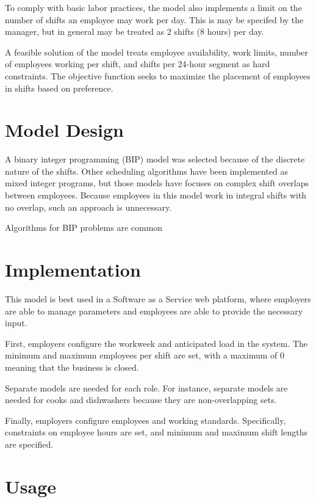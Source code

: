 To comply with basic labor practices, the model also implements a limit on the number of shifts an employee may work per day. This is may be specifed by the manager, but in general may be treated as 2 shifts (8 hours) per day. 

A feasible solution of the model treats employee availability, work limits, number of employees working per shift, and shifts per 24-hour segment as hard constraints. The objective function seeks to maximize the placement of employees in shifts based on preference.

\section{Model Design}

A binary integer programming (BIP) model was selected because of the discrete nature of the shifts. Other scheduling algorithms have been implemented as mixed integer programs, but those models have focuses on complex shift overlaps between employees. Because employees in this model work in integral shifts with no overlap, such an approach is unnecessary. 

Algorithms for BIP problems are common 

\section{Implementation}

This model is best used in a Software as a Service web platform, where employers are able to manage parameters and employees are able to provide the necessary input. 

First, employers configure the workweek and anticipated load in the system. The minimum and maximum employees per shift are set, with a maximum of 0 meaning that the business is closed. 

Separate models are needed for each role. For instance, separate models are needed for cooks and dishwashers because they are non-overlapping sets.

Finally, employers configure employees and working standards. Specifically, constraints on employee hours are set, and minimum and maximum shift lengths are specified. 

\section{Usage}







